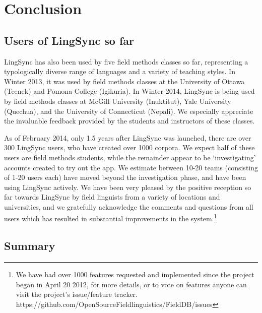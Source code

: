 \documentclass[letterpaper, 12pt, dvips]{mitwpl}
\begin{document}
\section{Conclusion } 
\label{sec:conclusion}

\subsection{Users of LingSync so far}
\label{sec:use}

LingSync has also been used by five field methods classes so far, representing a typologically diverse range of languages and a variety of teaching styles.  In Winter 2013, it was used by field methods classes 
at the University of Ottawa (Teenek) and Pomona College  (Igikuria). In Winter 2014, LingSync is being used by field methods classes
at McGill University (Inuktitut),
Yale University (Quechua),
and the University of Connecticut (Nepali). %
We especially appreciate the invaluable feedback provided by the students and instructors of these classes.

As of February 2014, only 1.5 years after LingSync was launched, there are over 300 LingSync users,
who have created over 1000 corpora.
We expect half of these users are field methods students, while the remainder appear to be `investigating' accounts created to try out the app.
We estimate between 10-20 teams (consisting of 1-20 users each) have moved beyond the investigation phase, and have been using LingSync actively. We have been very pleased by the positive reception so far towards LingSync by field linguists from a variety of locations and universities, and we gratefully acknowledge the comments and questions from all users which has resulted in substantial improvements in the system.\footnote{We have had over 1000 features requested and implemented since the project began in April 20 2012, for more details, or to vote on features anyone can visit the project's issue/feature tracker. \\https://github.com/OpenSourceFieldlinguistics/FieldDB/issues }

\subsection{Summary}
\label{sec:summary} 
\end{document}
